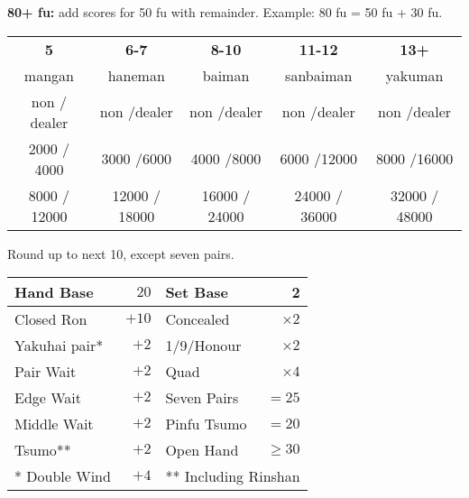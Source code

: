 \documentclass{article}
\newcommand\scorepair[2]{\hfill{}#1 $/$\hfill{}#2}
\begin{document}
\textbf{80+ fu:} add scores for 50 fu with remainder. Example: 80 fu = 50 fu + 30 fu.

\begin{tabular}{|c|c|c|c|c|}
  \hline
  \textbf{\large{}5} & \textbf{\large{}6-7} & \textbf{\large{}8-10} & \textbf{\large{}11-12} & \textbf{\large{}13+}\\
  mangan & haneman & baiman & sanbaiman & yakuman\\
  \hdashline
  \scorepair{non}{dealer} & \scorepair{non}{dealer} & \scorepair{non}{dealer} & \scorepair{non}{dealer} & \scorepair{non}{dealer}\\
  \hline\hline
  \scorepair{2000}{ 4000} & \scorepair{3000}{6000} & \scorepair{4000}{8000} & \scorepair{6000}{12000} & \scorepair{8000}{16000}\\
  \scorepair{8000}{12000} & \scorepair{12000}{18000} & \scorepair{16000}{24000} & \scorepair{24000}{ 36000} & \scorepair{32000}{ 48000}\\
  \hline
\end{tabular}

Round up to next 10, except seven pairs.

\begin{tabular}{|l|r|l|r|}
  \hline
  Hand Base & $20$ & Set Base & 2 \\
  \hline
  Closed Ron & $+10$ & Concealed & $\times 2$\\
  \hline
  Yakuhai pair* & $+2$ & 1/9/Honour & $\times 2$\\
  \hline
  Pair Wait & $+2$ & Quad & $\times 4$\\
  \hline
  Edge Wait & $+2$ & Seven Pairs & $=25$\\
  \hline
  Middle Wait & $+2$ & Pinfu Tsumo & $=20$\\
  \hline
  Tsumo** & $+2$ & Open Hand & $\ge 30$\\
  \hline
  * Double Wind & $+4$ & \multicolumn{2}{l|}{** Including Rinshan}\\
  \hline
\end{tabular}

\end{document}

